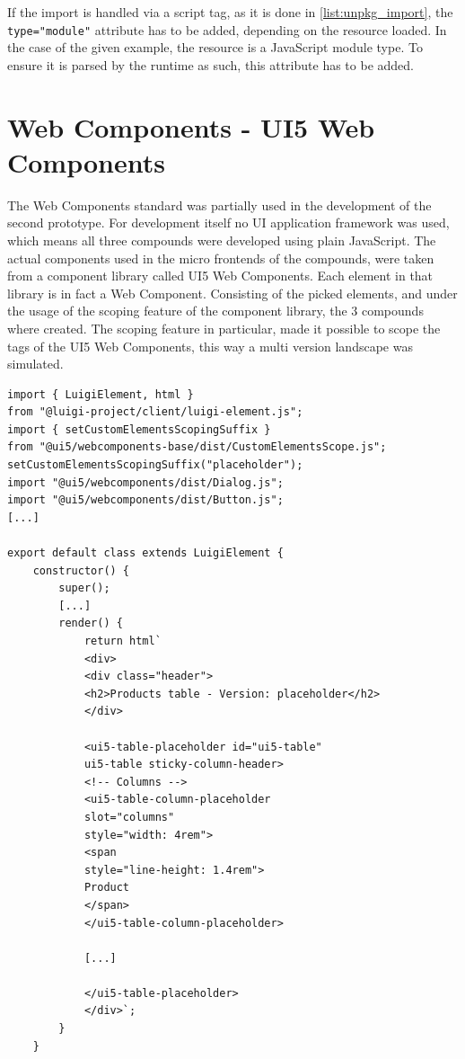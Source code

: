 If the import is handled via a script tag, as it is done in \ref{list:unpkg_import}, the \texttt{type="module"} attribute has to be added, depending on the resource loaded.
In the case of the given example, the resource is a JavaScript module type. To ensure it is parsed by the runtime as such, this attribute has to be added.\cite{js_module_type}

\section{Web Components - UI5 Web Components} 

The Web Components standard was partially used in the development of the second prototype. For development itself no UI application framework was used, which means all three compounds were developed using plain JavaScript. The actual components used in the micro frontends of the compounds, were taken from a component library called UI5 Web Components. Each element in that library is in fact a Web Component.\cite{ui5_wc_github}
Consisting of the picked elements, and under the usage of the scoping feature of the component library, the 3 compounds where created. The scoping feature in particular, made it possible to scope the tags of the UI5 Web Components, this way a multi version landscape was simulated.\cite{ui5_webcomponents_scoping}

\begin{lstlisting}[caption=Scoping feature used in the prototype, label=list:scoping_wc_prototype,  xleftmargin=.0\textwidth, xrightmargin=.0\textwidth]
import { LuigiElement, html } 
from "@luigi-project/client/luigi-element.js";
import { setCustomElementsScopingSuffix } 
from "@ui5/webcomponents-base/dist/CustomElementsScope.js";
setCustomElementsScopingSuffix("placeholder");
import "@ui5/webcomponents/dist/Dialog.js";
import "@ui5/webcomponents/dist/Button.js";
[...]

export default class extends LuigiElement {
	constructor() {
		super();
		[...]
		render() {
			return html`
			<div>
			<div class="header">
			<h2>Products table - Version: placeholder</h2>
			</div>
			
			<ui5-table-placeholder id="ui5-table" 
			ui5-table sticky-column-header>
			<!-- Columns -->
			<ui5-table-column-placeholder 
			slot="columns" 
			style="width: 4rem">
			<span 
			style="line-height: 1.4rem">
			Product
			</span>
			</ui5-table-column-placeholder>
			
			[...]
			
			</ui5-table-placeholder>
			</div>`;
		}
	}
\end{lstlisting}
	
